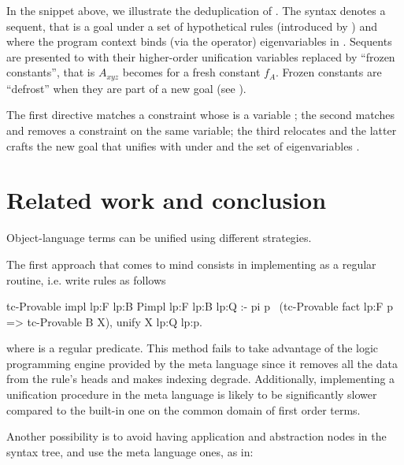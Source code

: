 In the snippet above, we illustrate the deduplication of \linketa. The syntax
 denotes a \lprolog sequent, that is a 
goal  under a set  of hypothetical rules (introduced
by \eI{=>}) and where the program context binds (via the 
operator) eigenvariables in . Sequents are presented to
\chr with their higher-order unification variables replaced by
``frozen constants'', that is $A_{xyz}$ becomes 
for a fresh constant $f_A$. Frozen constants are ``defrost'' when
they are part of a new goal (see \cite[section 4.3]{chr-elpi}).

\noindent
The first directive matches a constraint
whose \lhs is a variable ; the second matches and removes
a constraint on the same variable; the third
relocates  and the latter crafts the new goal that unifies
 with  under  and the set of
eigenvariables .


\noindent
\section{Related work and conclusion}

Object-language terms can be unified using
different strategies.

The first approach that comes to mind consists in implementing \Uo as a
regular routine, i.e. write rules as follows

\begin{elpicode}
  tc-Provable {{impl lp:F lp:B}} {{Pimpl lp:F lp:B lp:Q}} :-
    pi p \ 
      (tc-Provable {{fact lp:F}} p => tc-Provable B X),
      unify X {{lp:Q lp:p}}.
\end{elpicode}

\noindent
where  is a regular predicate.
This method fails to take advantage of the logic
programming engine provided by the meta language since
it removes all the data from the rule's heads and makes
indexing degrade. Additionally,
implementing a unification procedure in the meta language is likely to be significantly
slower compared to the built-in one on the common domain of first order terms.

Another possibility is to avoid having application and abstraction nodes
in the syntax tree, and use the meta language ones, as in:

